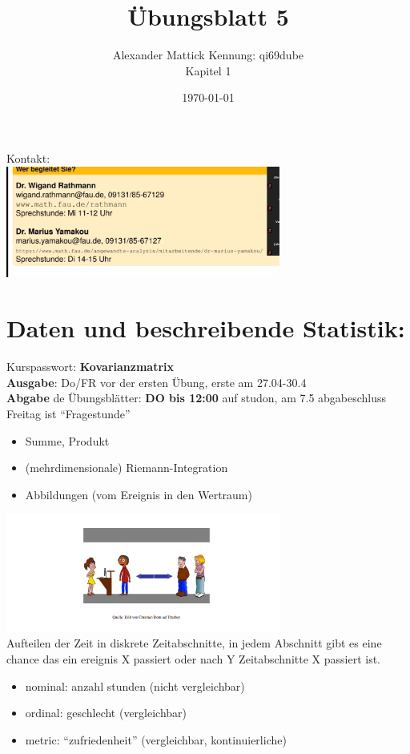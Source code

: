 \documentclass{article}
\title{Übungsblatt 5}
\author{
Alexander Mattick Kennung: qi69dube\\
Kapitel 1
}
\date{\today}
\begin{document}
	\maketitle
	Kontakt:\\
	\includegraphics[width=256pt]{Bildschirmfoto_2020-04-20_12-18-32.png}
	\section{Daten und beschreibende Statistik:}
	Kurspasswort: \textbf{Kovarianzmatrix}\\
	\textbf{Ausgabe}: Do/FR vor der ersten Übung, erste am 27.04-30.4\\
	\textbf{Abgabe} de Übungsblätter: \textbf{DO bis 12:00} auf studon, am 7.5 abgabeschluss\\
	Freitag ist ``Fragestunde''\\
	\begin{itemize}
		\item Summe, Produkt
		\item (mehrdimensionale) Riemann-Integration
		\item Abbildungen (vom Ereignis in den Wertraum)
	\end{itemize}
	\includegraphics[width=256pt]{warteschlange.png}\\
	Aufteilen der Zeit in diskrete Zeitabschnitte, in jedem Abschnitt gibt es eine chance das ein ereignis X passiert oder nach Y Zeitabschnitte X passiert ist.\\
	\begin{itemize}
		\item nominal: anzahl stunden (nicht vergleichbar)
		\item ordinal: geschlecht (vergleichbar)
		\item metric: ``zufriedenheit'' (vergleichbar, kontinuierliche)
	\end{itemize}
\end{document}
